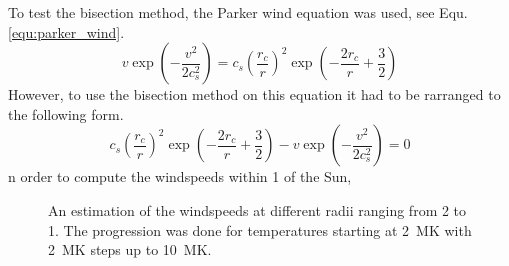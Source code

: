 \documentclass{aa}
\begin{document}
To test the bisection method, the Parker wind equation was used, see Equ.
\ref{equ:parker_wind}.
\begin{equation}
    \label{equ:parker_wind}
    v \exp \left(-\frac{v^2}{2c_s^2}\right) = c_s \left(\frac{r_c}{r}\right)^2
    \exp \left(- \frac{2r_c}{r} + \frac{3}{2}\right)
\end{equation}
However, to use the bisection method on this equation it had to be rarranged to
the following form.
\begin{equation}
    \label{equ:parker_alternate}
    c_s \left(\frac{r_c}{r}\right)^2 \exp \left(-\frac{2r_c}{r} + \frac{3}{2}\right)
    -v \exp \left(- \frac{v^2}{2c_s^2}\right) = 0
\end{equation}
n order to compute the windspeeds within \SI{1}{\AU} of the Sun,
\begin{figure}[htbp]
    \caption{An estimation of the windspeeds at different radii ranging from
    \SI{2}{\Rsol} to \SI{1}{\AU}. The progression was done for temperatures
    starting at \SI{2}{\mega\kelvin} with \SI{2}{\mega\kelvin} steps up to
    \SI{10}{\mega\kelvin}.}
    \label{fig:Parker_results}
\end{figure}
\end{document}
